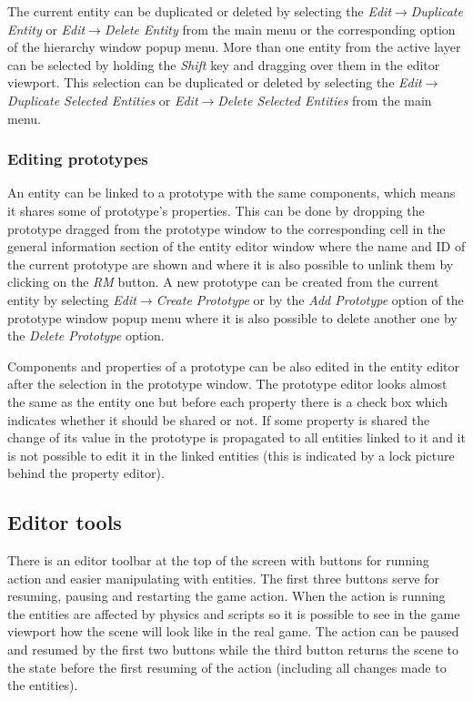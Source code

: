 The current entity can be duplicated or deleted by selecting the \emph{Edit}$\rightarrow$\emph{Du\-pli\-ca\-te Entity} or \emph{Edit}$\rightarrow$\emph{Delete Entity} from the main menu or the corresponding option of the hierarchy window popup menu. More than one entity from the active layer can be selected by holding the \emph{Shift} key and dragging over them in the editor viewport. This selection can be duplicated or deleted by selecting the \emph{Edit}$\rightarrow$\emph{Duplicate Selected Entities} or \emph{Edit}$\rightarrow$\emph{Delete Selected Entities} from the main menu.

\subsubsection{Editing prototypes}

An entity can be linked to a prototype with the same components, which means it shares some of prototype's properties. This can be done by dropping the prototype dragged from the prototype window to the corresponding cell in the general information section of the entity editor window where the name and ID of the current prototype are shown and where it is also possible to unlink them by clicking on the \emph{RM} button. A new prototype can be created from the current entity by selecting \emph{Edit}$\rightarrow$\emph{Create Prototype} or by the \emph{Add Prototype} option of the prototype window popup menu where it is also possible to delete another one by the \emph{Delete Prototype} option.

Components and properties of a prototype can be also edited in the entity editor after the selection in the prototype window. The prototype editor looks almost the same as the entity one but before each property there is a check box which indicates whether it should be shared or not. If some property is shared the change of its value in the prototype is propagated to all entities linked to it and it is not possible to edit it in the linked entities (this is indicated by a lock picture behind the property editor).

\subsection{Editor tools}
\label{sub:editor-tools}

There is an editor toolbar at the top of the screen with buttons for running action and easier manipulating with entities. The first three buttons serve for resuming, pausing and restarting the game action. When the action is running the entities are affected by physics and scripts so it is possible to see in the game viewport how the scene will look like in the real game. The action can be paused and resumed by the first two buttons while the third button returns the scene to the state before the first resuming of the action (including all changes made to the entities).

